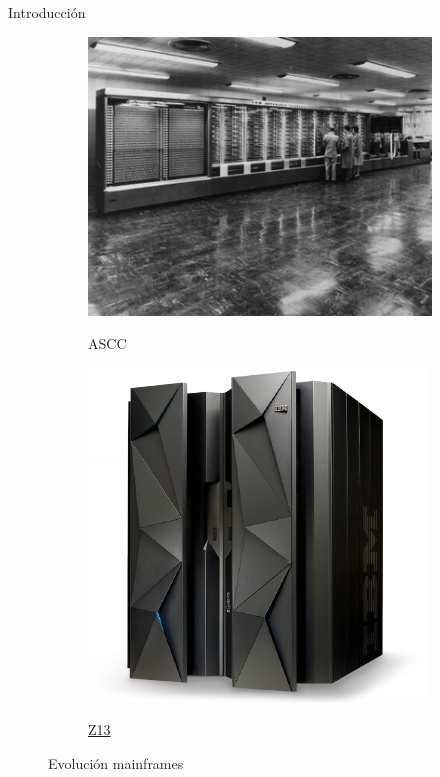\documentclass[compress]{beamer}
\begin{document}
\begin{frame}{Introducción}
	\begin{figure}[H]
		\centering
		\begin{subfigure}{.5\textwidth}
			\centering
			\href{https://www-03.ibm.com/ibm/history/exhibits/markI/markI_intro.html}{		\includegraphics[width=.75\linewidth]{./Imagenes/ascc.jpg}}
			\caption{ASCC}
			\label{fig:ascc}
		\end{subfigure}%
		\begin{subfigure}{.5\textwidth}
			\centering
			\href{https://www-03.ibm.com/systems/z/hardware/z13.html}{\includegraphics[width=.65\linewidth]{./Imagenes/z13.jpg}}
			\caption{\href{https://www-03.ibm.com/systems/z/}{Z13}}
			\label{fig:z13}
		\end{subfigure}
		\caption{Evolución mainframes}
	\end{figure}
\end{frame}
\end{document}
